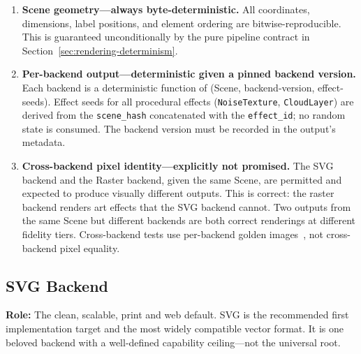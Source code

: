 \begin{enumerate}
  \item \textbf{Scene geometry---always byte-deterministic.} All coordinates, dimensions,
        label positions, and element ordering are bitwise-reproducible. This is guaranteed
        unconditionally by the pure pipeline contract in
        Section~\ref{sec:rendering-determinism}.

  \item \textbf{Per-backend output---deterministic given a pinned backend version.}
        Each backend is a deterministic function of (Scene, backend-version,
        effect-seeds). Effect seeds for all procedural effects (\texttt{NoiseTexture},
        \texttt{CloudLayer}) are derived from the \texttt{scene\_hash} concatenated with
        the \texttt{effect\_id}; no random state is consumed. The backend version must
        be recorded in the output's metadata.

  \item \textbf{Cross-backend pixel identity---explicitly not promised.}
        The SVG backend and the Raster backend, given the same Scene, are permitted and
        expected to produce visually different outputs. This is correct: the raster backend
        renders art effects that the SVG backend cannot. Two outputs from the same Scene
        but different backends are both correct renderings at different fidelity tiers.
        Cross-backend tests use per-backend golden images~\cite{golden-image-testing},
        not cross-backend pixel equality.
\end{enumerate}

\subsection{SVG Backend}
\label{sec:output-svg}

\textbf{Role:} The clean, scalable, print and web default. SVG is the recommended first
implementation target and the most widely compatible vector format. It is one beloved
backend with a well-defined capability ceiling---not the universal root.

